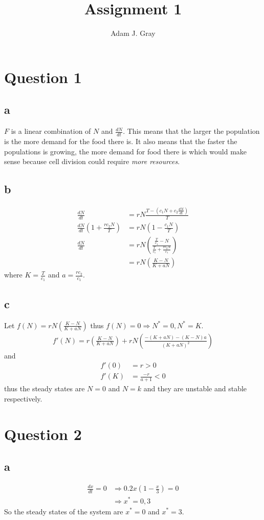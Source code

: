 \documentclass{unswmaths}
\author{Adam J. Gray}
\title{Assignment 1}
\begin{document}
\unswtitle

\section*{Question 1}
\subsection*{a}
	$ F $ is a linear combination of $ N $ and $ \frac{dN}{dt} $. This means that the larger the population is the more demand for the food there is. It also means that the faster the populations is growing, the more demand for food there is which would make sense because cell division could require \emph{more resources}.
\subsection*{b}
	\begin{align*}
		\frac{dN}{dt} &= rN \frac{T - \left(c_1N + c_2\frac{dN}{dt}\right)}{T} \\
		\frac{dN}{dt} \left( 1 + \frac{rc_2N}{T}\right) &= rN\left(1 - \frac{c_1N}{T} \right) \\
		\frac{dN}{dt} &= rN \left( \frac{\frac{T}{c_1} - N}{\frac{T}{c_1} + \frac{rc_2N}{c_1}} \right) \\
			&= rN \left( \frac{K - N}{K + aN}\right)
	\end{align*}
	where $ K = \frac{T}{c_1} $ and $ a = \frac{rc_2}{c_1} $.
\subsection*{c}
	Let $ f(N) = rN\left( \frac{K-N}{K+aN} \right) $ thus $ f(N) = 0 \Longrightarrow N^* = 0, N^* = K $.
	\begin{align*}
		f'(N) = r \left( \frac{K-N}{K+aN} \right) + rN \left( \frac{-(K+aN) - (K-N)a}{(K+aN)^2}\right)
	\end{align*}
	and
	\begin{align*}
		f'(0) &= r > 0 \\
		f'(K) &= \frac{-r}{a+1} < 0
	\end{align*}
	thus the steady states are $ N = 0 $ and $ N = k $ and they are unstable and stable respectively.
\section*{Question 2}
\subsection*{a}
	\begin{align*}
		\frac{dx}{dt} = 0 &\Longrightarrow 0.2x\left( 1 - \frac{x}{3} \right) = 0 \\
			& \Longrightarrow x^* = 0, 3
	\end{align*}
	So the steady states of the system are $ x^* = 0 $ and $ x^* = 3 $.
\end{document}
